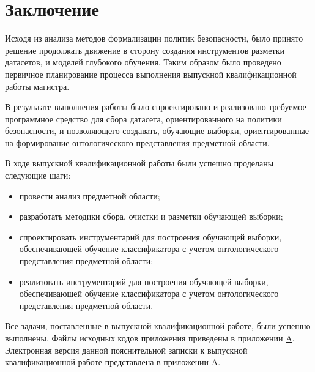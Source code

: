 \documentclass[../main]{subfiles}
\begin{document}
\newpage
{}
{}
\section*{Заключение}

Исходя из анализа методов формализации политик безопасности, было принято решение продолжать движение в сторону создания инструментов разметки датасетов, и моделей глубокого обучения. Таким образом было проведено первичное планирование процесса выполнения выпускной квалификационной работы магистра.

В результате выполнения работы было спроектировано и реализовано требуемое программное средство для сбора датасета, ориентированного на политики безопасности, и позволяющего создавать, обучающие выборки, ориентированные на формирование онтологического представления предметной области.

В ходе выпускной квалификационной работы были успешно проделаны следующие шаги:

\begin{itemize}
    \item провести анализ предметной области;
    \item разработать методики сбора, очистки и разметки обучающей выборки;
    \item спроектировать инструментарий для построения обучающей выборки, обеспечивающей обучение классификатора с учетом онтологического представления предметной области;
    \item реализовать  инструментарий для построения обучающей выборки, обеспечивающей обучение классификатора с учетом онтологического представления предметной области.
\end{itemize}

Все задачи, поставленные в выпускной квалификационной работе, были успешно выполнены. Файлы исходных кодов приложения приведены в приложении \hyperref[sec:appendix]{A}.  Электронная  версия  данной  пояснительной  записки  к выпускной квалификационной работе представлена в приложении \hyperref[sec:appendix]{A}.
\end{document}
